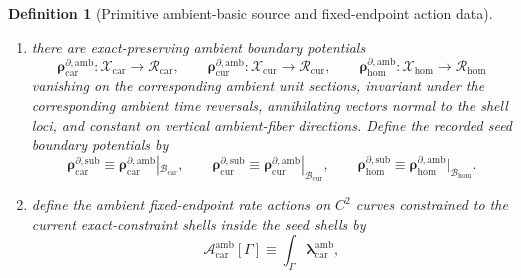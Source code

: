 \documentclass[11pt]{article}
\newcommand{\TensorFluxClass}{\mathscr J_{\mathrm{car}}}
\newcommand{\CurFluxClass}{\mathscr J_{\mathrm{cur}}}
\newcommand{\HomFluxClass}{\mathscr J_{\mathrm{hom}}}
\newcommand{\TensorPhaseReadClass}{\mathscr R_{\mathrm{car}}}
\newcommand{\CurPhaseReadClass}{\mathscr R_{\mathrm{cur}}}
\newcommand{\HomPhaseReadClass}{\mathscr R_{\mathrm{hom}}}
\newcommand{\TensorSeedSpace}{\mathcal B_{\mathrm{car}}}
\newcommand{\CurSeedSpace}{\mathcal B_{\mathrm{cur}}}
\newcommand{\HomSeedSpace}{\mathcal B_{\mathrm{hom}}}
\newcommand{\TensorSeedDensitySource}{\boldsymbol{q}_{\mathrm{car}}^{\mathrm{sub}}}
\newcommand{\CurSeedDensitySource}{\boldsymbol{q}_{\mathrm{cur}}^{\mathrm{sub}}}
\newcommand{\HomSeedDensitySource}{\boldsymbol{q}_{\mathrm{hom}}^{\mathrm{sub}}}
\newcommand{\TensorSeedFluxSource}{\boldsymbol{j}_{\mathrm{car}}^{\mathrm{sub}}}
\newcommand{\CurSeedFluxSource}{\boldsymbol{j}_{\mathrm{cur}}^{\mathrm{sub}}}
\newcommand{\HomSeedFluxSource}{\boldsymbol{j}_{\mathrm{hom}}^{\mathrm{sub}}}
\newcommand{\TensorSeedBoundarySource}{\boldsymbol{\rho}_{\mathrm{car}}^{\partial,\mathrm{sub}}}
\newcommand{\CurSeedBoundarySource}{\boldsymbol{\rho}_{\mathrm{cur}}^{\partial,\mathrm{sub}}}
\newcommand{\HomSeedBoundarySource}{\boldsymbol{\rho}_{\mathrm{hom}}^{\partial,\mathrm{sub}}}
\newcommand{\TensorAmbientSpace}{\mathcal X_{\mathrm{car}}}
\newcommand{\CurAmbientSpace}{\mathcal X_{\mathrm{cur}}}
\newcommand{\HomAmbientSpace}{\mathcal X_{\mathrm{hom}}}
\newcommand{\TensorAmbientRateForm}{\boldsymbol{\lambda}_{\mathrm{car}}^{\mathrm{amb}}}
\newcommand{\TensorAmbientDensitySource}{\boldsymbol{q}_{\mathrm{car}}^{\mathrm{amb}}}
\newcommand{\CurAmbientDensitySource}{\boldsymbol{q}_{\mathrm{cur}}^{\mathrm{amb}}}
\newcommand{\HomAmbientDensitySource}{\boldsymbol{q}_{\mathrm{hom}}^{\mathrm{amb}}}
\newcommand{\TensorAmbientFluxSource}{\boldsymbol{j}_{\mathrm{car}}^{\mathrm{amb}}}
\newcommand{\CurAmbientFluxSource}{\boldsymbol{j}_{\mathrm{cur}}^{\mathrm{amb}}}
\newcommand{\HomAmbientFluxSource}{\boldsymbol{j}_{\mathrm{hom}}^{\mathrm{amb}}}
\newcommand{\TensorAmbientBoundarySource}{\boldsymbol{\rho}_{\mathrm{car}}^{\partial,\mathrm{amb}}}
\newcommand{\CurAmbientBoundarySource}{\boldsymbol{\rho}_{\mathrm{cur}}^{\partial,\mathrm{amb}}}
\newcommand{\HomAmbientBoundarySource}{\boldsymbol{\rho}_{\mathrm{hom}}^{\partial,\mathrm{amb}}}
\newcommand{\TensorAmbientAction}{\mathscr A_{\mathrm{car}}^{\mathrm{amb}}}
\newtheorem{definition}{Definition}
\begin{document}
\begin{definition}[Primitive ambient-basic source and fixed-endpoint action data]
\begin{enumerate}
    \[
    \TensorAmbientFluxSource:\TensorAmbientSpace\to\TensorFluxClass,\qquad
    \CurAmbientFluxSource:\CurAmbientSpace\to\CurFluxClass,\qquad
    \HomAmbientFluxSource:\HomAmbientSpace\to\HomFluxClass,
    \]
    invariant under the corresponding ambient time reversals, preserved along the characteristic curves on the current exact-constraint shells, and constant on shell-normal directions and on vertical ambient-fiber directions. Define the recorded seed density and seed flux source fields by restriction:
    \begin{equation}
    \TensorSeedDensitySource\equiv\TensorAmbientDensitySource|_{\TensorSeedSpace},\qquad
    \CurSeedDensitySource\equiv\CurAmbientDensitySource|_{\CurSeedSpace},\qquad
    \HomSeedDensitySource\equiv\HomAmbientDensitySource|_{\HomSeedSpace},
    \label{eq:seed_density_from_ambient}
    \end{equation}
    \begin{equation}
    \TensorSeedFluxSource\equiv\TensorAmbientFluxSource|_{\TensorSeedSpace},\qquad
    \CurSeedFluxSource\equiv\CurAmbientFluxSource|_{\CurSeedSpace},\qquad
    \HomSeedFluxSource\equiv\HomAmbientFluxSource|_{\HomSeedSpace}.
    \label{eq:seed_flux_from_ambient}
    \end{equation}
    \item there are exact-preserving ambient boundary potentials
    \[
    \TensorAmbientBoundarySource:\TensorAmbientSpace\to\TensorPhaseReadClass,\qquad
    \CurAmbientBoundarySource:\CurAmbientSpace\to\CurPhaseReadClass,\qquad
    \HomAmbientBoundarySource:\HomAmbientSpace\to\HomPhaseReadClass
    \]
    vanishing on the corresponding ambient unit sections, invariant under the corresponding ambient time reversals, annihilating vectors normal to the shell loci, and constant on vertical ambient-fiber directions. Define the recorded seed boundary potentials by
    \begin{equation}
    \TensorSeedBoundarySource\equiv\TensorAmbientBoundarySource|_{\TensorSeedSpace},\qquad
    \CurSeedBoundarySource\equiv\CurAmbientBoundarySource|_{\CurSeedSpace},\qquad
    \HomSeedBoundarySource\equiv\HomAmbientBoundarySource|_{\HomSeedSpace}.
    \label{eq:seed_boundary_from_ambient}
    \end{equation}
    \item define the ambient fixed-endpoint rate actions on \(C^2\) curves constrained to the current exact-constraint shells inside the seed shells by
    \begin{equation}
    \TensorAmbientAction[\Gamma]\equiv\int_\Gamma \TensorAmbientRateForm,

\end{equation}
\end{enumerate}
\end{definition}
\end{document}
